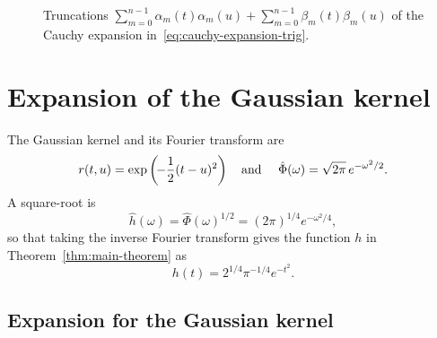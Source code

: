 \documentclass{article}
\begin{document}
\begin{figure}[h]
  \begin{center}
    \label{fig:cauchy-truncation}
  \end{center}
  \caption{Truncations $\sum_{m = 0}^{n - 1} \alpha_m (t) \alpha_m (u) +
  \sum_{m = 0}^{n - 1} \beta_m (t) \beta_m (u)$ of the Cauchy expansion
  in~\eqref{eq:cauchy-expansion-trig}.}
\end{figure}

\section{Expansion of the Gaussian kernel}\label{sec:gaussian}

The Gaussian kernel and its Fourier transform are
\begin{equation}
  \label{eq:gaussian-kernel} r (t, u) = \exp \left( \hspace{-0.17em} -
  \frac{1}{2} (t - u)^2 \right)  \quad \text{and } \quad \hat{\Phi} (\omega) =
  \sqrt{2 \pi}  \hspace{0.17em} e^{- \omega^2 / 2} .
\end{equation}
A square-root is
\[ \hat{h} (\omega) = \hat{\Phi} (\omega)^{1 / 2} = (2 \pi)^{1 / 4} e^{-
   \omega^2 / 4}, \]
so that taking the inverse Fourier transform gives the function $h$ in 
Theorem~\ref{thm:main-theorem} as
\begin{equation}
  \label{eq:h-gaussian} h (t) = 2^{1 / 4} \pi^{- 1 / 4} e^{- t^2} .
\end{equation}
\subsection{Expansion for the Gaussian kernel}\label{sec:gaussian-expansion}
\end{document}
